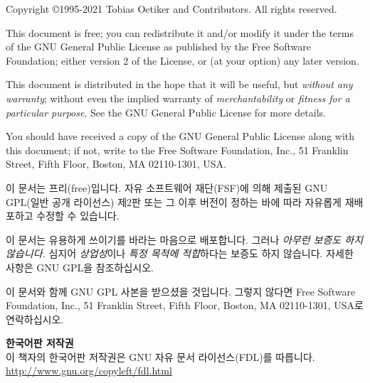 \begin{small} 
  \noindent Copyright \copyright 1995-2021 Tobias Oetiker and Contributors.  All rights reserved.
 
  This document is free; you can redistribute it and/or modify it
  under the terms of the GNU General Public License as published by
  the Free Software Foundation; either version 2 of the License, or
  (at your option) any later version.
  
  This document is distributed in the hope that it will be useful, but
  \emph{without any warranty}; without even the implied warranty of
  \emph{merchantability} or \emph{fitness for a particular purpose}\@.  See the GNU
  General Public License for more details.
  
  You should have received a copy of the GNU General Public License
  along with this document; if not, write to the Free Software
 Foundation, Inc., 51 Franklin Street, Fifth Floor, Boston, MA 02110-1301, USA.
 
  \bigskip

  이 문서는 프리(free)입니다. 자유 소프트웨어 재단(FSF)에 의해
  제출된 GNU GPL(일반 공개 라이선스) 제2판 또는 그 이후 버전이
  정하는 바에 따라 자유롭게 재배포하고 수정할 수 있습니다.
  
  이 문서는 유용하게 쓰이기를 바라는 마음으로 배포합니다. 그러나
  \emph{아무런 보증도 하지 않습니다.} 심지어 \emph{상업성}이나
  \emph{특정 목적에 적합}하다는 보증도 하지 않습니다.
  자세한 사항은 GNU GPL을 참조하십시오.
  
  이 문서와 함께 GNU GPL 사본을 받으셨을 것입니다. 그렇지 않다면
Free Software Foundation, Inc., 51 Franklin Street, Fifth Floor, Boston, MA 02110-1301, USA로 연락하십시오.
  
  \bigskip
  \noindent \textbf{한국어판 저작권}\\
   \indent 이 책자의 한국어판
  저작권은 GNU 자유 문서 라이선스(FDL)를 따릅니다.
  \url{http://www.gnu.org/copyleft/fdl.html}


\end{small}

